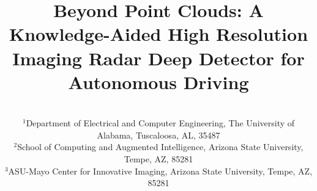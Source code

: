 \documentclass[conference]{IEEEtran}
\begin{document}



\title{\LARGE Beyond Point Clouds: A  Knowledge-Aided High Resolution Imaging Radar Deep Detector for Autonomous Driving
}
\vspace{-2mm}
\author{  \\
\normalsize $^{1}$Department of Electrical and Computer Engineering, The University of Alabama, Tuscaloosa, AL, 35487\\
$^{2}$School of Computing and Augmented Intelligence, Arizona State University, Tempe, AZ, 85281 \\
$^{3}$ASU-Mayo Center for Innovative Imaging, Arizona State University, Tempe, AZ, 85281
\vspace{-6mm}}
\end{document}

